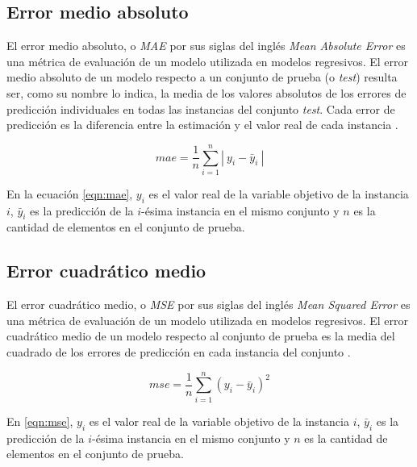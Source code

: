     
    \subsection{Error medio absoluto}
    El error medio absoluto, o \textit{MAE} por sus siglas del inglés \textit{Mean Absolute Error} es una métrica de evaluación de un modelo utilizada
    en modelos regresivos. El error medio absoluto de un modelo respecto a un conjunto de prueba (o \textit{test}) resulta ser, como su nombre lo indica, la media de los
    valores absolutos de los errores de predicción individuales en todas las instancias del conjunto \textit{test}. Cada error de predicción es la diferencia entre la estimación 
    y el valor real de cada instancia \cite{5}.
    
    \begin{equation}\label{eqn:mae}
        mae = \frac{1}{n} \sum_{i=1}^n|~y_i - \bar{y}_i~|
    \end{equation}

    En la ecuación \ref{eqn:mae}, $y_i$ es el valor real de la variable objetivo de la instancia $i$, $\bar{y}_i$ es la predicción de la $i$-ésima instancia en el mismo conjunto
    y $n$ es la cantidad de elementos en el conjunto de prueba.

    \subsection{Error cuadrático medio}
    El error cuadrático medio, o \textit{MSE} por sus siglas del inglés \textit{Mean Squared Error} es una métrica de evaluación de un modelo utilizada
    en modelos regresivos. El error cuadrático medio de un modelo respecto al conjunto de prueba es la media del cuadrado de los errores de predicción 
    en cada instancia del conjunto \cite{4}.

    \begin{equation}\label{eqn:mse}
        mse = \frac{1}{n} \sum_{i=1}^n(y_i - \bar{y}_i)^2
    \end{equation}

    En \ref{eqn:mse}, $y_i$ es el valor real de la variable objetivo de la instancia $i$, $\bar{y}_i$ es la predicción de la $i$-ésima instancia en el mismo conjunto
    y $n$ es la cantidad de elementos en el conjunto de prueba.
%   
%
%
%
